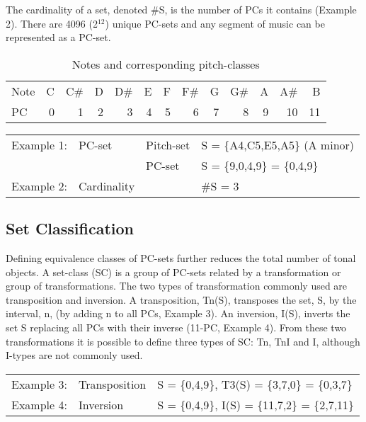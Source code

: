 \documentclass{article}
\begin{document}
The cardinality of a set, denoted \#S, is the number of PCs it contains
(Example 2). There are 4096 (2$^{\mathrm{12}}$) unique PC-sets and any segment of
music can be represented as a PC-set.

\begin{table}[htb]
\caption{Notes and corresponding pitch-classes} 
\begin{center}
\begin{tabular}{lrrrrrrrrrrrr}
 Note  &  C  &  C\#  &  D  &  D\#  &  E  &  F  &  F\#  &  G  &  G\#  &  A  &  A\#  &   B  \\
 PC    &  0  &    1  &  2  &    3  &  4  &  5  &    6  &  7  &    8  &  9  &   10  &  11  \\
\end{tabular}
\end{center}
\end{table}



\begin{center}
\begin{tabular}{llll}
 Example 1:  &  PC-set       &  Pitch-set  &  S = \{A4,C5,E5,A5\} (A minor)  \\
             &               &  PC-set     &  S = \{9,0,4,9\} = \{0,4,9\}    \\
 Example 2:  &  Cardinality  &             &  \#S = 3                        \\
\end{tabular}
\end{center}
\subsection{Set Classification}
\label{sec-3-2}

Defining equivalence classes of PC-sets further reduces the total
number of tonal objects. A set-class (SC) is a group of PC-sets
related by a transformation or group of transformations. The two types
of transformation commonly used are transposition and inversion. A
transposition, Tn(S), transposes the set, S, by the interval, n, (by
adding n to all PCs, Example 3). An inversion, I(S), inverts the set S
replacing all PCs with their inverse (11-PC, Example 4). From these
two transformations it is possible to define three types of SC: Tn,
TnI and I, although I-types are not commonly used.


\begin{center}
\begin{tabular}{lll}
 Example 3:  &  Transposition  &  S = \{0,4,9\}, T3(S) = \{3,7,0\} = \{0,3,7\}   \\
 Example 4:  &  Inversion      &  S = \{0,4,9\}, I(S) = \{11,7,2\} = \{2,7,11\}  \\
\end{tabular}
\end{center}
\end{document}
